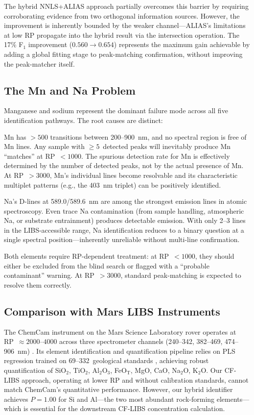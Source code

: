 The hybrid NNLS+ALIAS approach partially overcomes this barrier by requiring corroborating evidence from two orthogonal information sources.
However, the improvement is inherently bounded by the weaker channel---ALIAS's limitations at low RP propagate into the hybrid result via the intersection operation.
The 17\% F$_1$ improvement ($0.560 \to 0.654$) represents the maximum gain achievable by adding a global fitting stage to peak-matching confirmation, without improving the peak-matcher itself.

\subsection{The Mn and Na Problem}

Manganese and sodium represent the dominant failure mode across all five identification pathways.
The root causes are distinct:

Mn has $> 500$ transitions between 200--900~nm, and no spectral region is free of Mn lines.
Any sample with $\geq 5$~detected peaks will inevitably produce Mn ``matches'' at RP~$< 1000$.
The spurious detection rate for Mn is effectively determined by the number of detected peaks, not by the actual presence of Mn.
At RP~$> 3000$, Mn's individual lines become resolvable and its characteristic multiplet patterns (e.g., the 403~nm triplet) can be positively identified.

Na's D-lines at 589.0/589.6~nm are among the strongest emission lines in atomic spectroscopy.
Even trace Na contamination (from sample handling, atmospheric Na, or substrate entrainment) produces detectable emission.
With only 2--3 lines in the LIBS-accessible range, Na identification reduces to a binary question at a single spectral position---inherently unreliable without multi-line confirmation.

Both elements require RP-dependent treatment: at RP~$< 1000$, they should either be excluded from the blind search or flagged with a ``probable contaminant'' warning.
At RP~$> 3000$, standard peak-matching is expected to resolve them correctly.

\subsection{Comparison with Mars LIBS Instruments}

The ChemCam instrument on the Mars Science Laboratory rover operates at RP~$\approx 2000$--$4000$ across three spectrometer channels (240--342, 382--469, 474--906~nm) \citep{Wiens2013}.
Its element identification and quantification pipeline relies on PLS regression trained on 69--332~geological standards \citep{Clegg2017}, achieving robust quantification of SiO$_2$, TiO$_2$, Al$_2$O$_3$, FeO$_\mathrm{T}$, MgO, CaO, Na$_2$O, K$_2$O.
Our CF-LIBS approach, operating at lower RP and without calibration standards, cannot match ChemCam's quantitative performance.
However, our hybrid identifier achieves $P = 1.00$ for Si and Al---the two most abundant rock-forming elements---which is essential for the downstream CF-LIBS concentration calculation.

